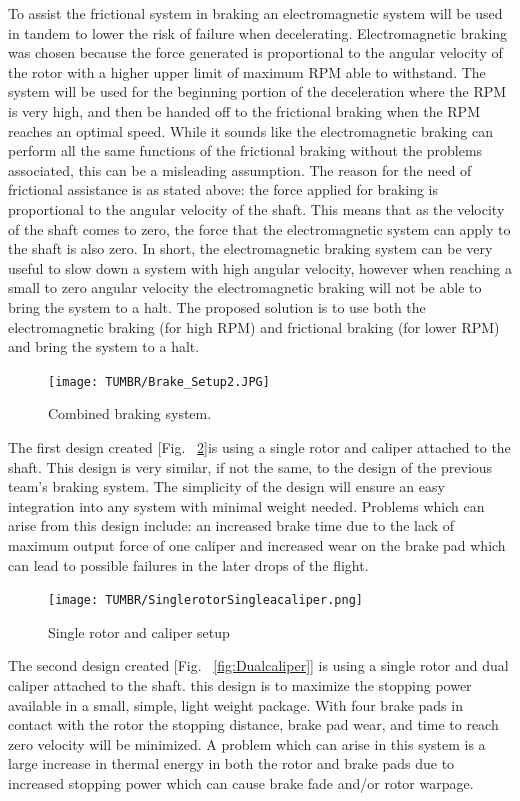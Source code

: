 \indent\indent To assist the frictional system in braking an electromagnetic system will be used in tandem to lower the risk of failure when decelerating. Electromagnetic braking was chosen because the force generated is proportional to the angular velocity of the rotor with a higher upper limit of maximum RPM able to withstand. The system will be used for the beginning portion of the deceleration where the RPM is very high, and then be handed off to the frictional braking when the RPM reaches an optimal speed. While it sounds like the electromagnetic braking can perform all the same functions of the frictional braking without the problems associated, this can be a misleading assumption.  The reason for the need of frictional assistance is as stated above: the force applied for braking is proportional to the angular velocity of the shaft. This means that as the velocity of the shaft comes to zero, the force that the electromagnetic system can apply to the shaft is also zero. In short, the electromagnetic braking system can be very useful to slow down a system with high angular velocity, however when reaching a small to zero angular velocity the electromagnetic braking will not be able to bring the system to a halt. The proposed solution is to use both the electromagnetic braking (for high RPM) and frictional braking (for lower RPM) and bring the system to a halt.

\begin{figure}[H]
  \centering
  \texttt{[image: TUMBR/Brake\_Setup2.JPG]}
  \caption{\label{fig:com}Combined braking system.}
\end{figure}

\indent\indent The first design created [Fig. ~\ref{fig:single}]is using a single rotor and caliper attached to the shaft. This design is very similar, if not the same, to the design of the previous team's braking system. The simplicity of the design will ensure an easy integration into any system with minimal weight needed. Problems which can arise from this design include: an increased brake time due to the lack of maximum output force of one caliper and increased wear on the brake pad which can lead to possible failures in the later drops of the flight.

\begin{figure}[!ht]
  \centering
  \texttt{[image: TUMBR/SinglerotorSingleacaliper.png]}
  \caption{\label{fig:single}Single rotor and caliper setup}
\end{figure}

\indent\indent The second design created [Fig. ~\ref{fig:Dualcaliper}] is using a single rotor and dual caliper attached to the shaft. this design is to maximize the stopping power available in a small, simple, light weight package. With four brake pads in contact with the rotor the stopping distance, brake pad wear, and time to reach zero velocity will be minimized. A problem which can arise in this system is a large increase in thermal energy in both the rotor and brake pads due to increased stopping power which can cause brake fade and/or rotor warpage.

